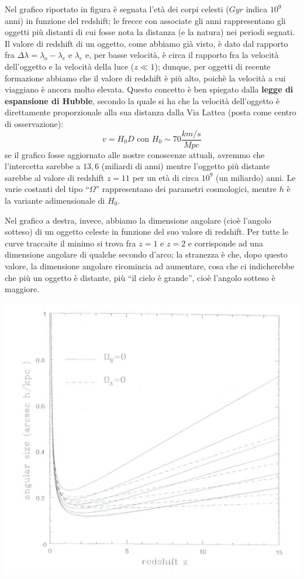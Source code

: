Nel grafico riportato in figura è segnata l'età dei corpi celesti ($Gyr$ indica $10^9$ anni) in funzione del redshift; le frecce con associate gli anni rappresentano gli oggetti più distanti di cui fosse nota la distanza (e la natura) nei periodi segnati. Il valore di redshift di un oggetto, come abbiamo già visto, è dato dal rapporto fra $\Delta \lambda=\lambda_o-\lambda_e$ e $\lambda_e$ e, per basse velocità, è circa il rapporto fra la velocità dell'oggetto e la velocità della luce ($z \ll 1$); dunque, per oggetti di recente formazione abbiamo che  il valore di redshift è più alto, poichè la velocità a cui viaggiano è ancora molto elevata. Questo concetto è ben spiegato dalla \textbf{legge di espansione di Hubble}, secondo la quale si ha che la velocità dell'oggetto è direttamente proporzionale alla sua distanza dalla Via Lattea (posta come centro di osservazione):
$$v=H_0 D \text{   con } H_0 \sim 70 \frac{km/s}{Mpc}$$
se il grafico fosse aggiornato alle nostre conoscenze attuali, avremmo che l'intercetta sarebbe a $13,6$ (miliardi di anni) mentre l'oggetto più distante sarebbe al valore di redshift $z=11$ per un età di circa $10^9$ (un miliardo) anni. Le varie costanti del tipo ``$\Omega$'' rappresentano dei parametri cosmologici, mentre $h$ è la variante adimensionale di $H_0$.
\vspace{0.05cm}
\\
\begin{minipage}{.60\textwidth}
	Nel grafico a destra, invece, abbiamo la dimensione angolare (cioè l'angolo sotteso) di un oggetto celeste in funzione del suo valore di redshift. Per tutte le curve traccaite il minimo si trova fra $z=1$ e $z=2$ e corrisponde ad una dimensione angolare di qualche secondo d'arco; la stranezza è che, dopo questo valore, la dimensione angolare ricomincia ad aumentare, cosa che ci indicherebbe che più un oggetto è distante, più ``il cielo è grande'', cioè l'angolo sotteso è maggiore.
\end{minipage}
\begin{minipage}{.40\textwidth}
	\centering
	\includegraphics[width=1\textwidth]{Img/bertin_6bis.png}
\end{minipage}

